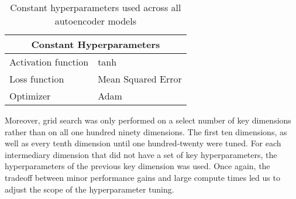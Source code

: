 \documentclass{article}
\begin{document}
\begin{table}[h!]
    \caption{Constant hyperparameters used across all autoencoder models}
    \label{tab:table1}
    \vspace{0.1cm}
    \begin{tabular}{p{4cm}p{7cm}}
        \hline
        \multicolumn{2}{c}{Constant Hyperparameters}\\
        \hline
        Activation function & tanh\\
        Loss function & Mean Squared Error  \\
        Optimizer & Adam \\
        \hline
    \end{tabular}
\end{table}
Moreover, grid search was only performed on a select number of key dimensions rather than on all one hundred ninety dimensions. The first ten dimensions, as well as every tenth dimension until one hundred-twenty were tuned. For each intermediary dimension that did not have a set of key hyperparameters, the hyperparameters of the previous key dimension was used. Once again, the tradeoff between minor performance gains and large compute times led us to adjust the scope of the  hyperparameter tuning.
\end{document}

